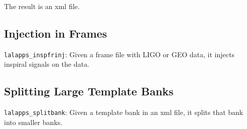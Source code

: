   The result is an xml file.

\subsection{Injection in Frames}

\texttt{lalapps\_inspfrinj}: Given a frame file with LIGO or GEO data, it
injects inspiral signals on the data.


\subsection{Splitting Large Template Banks}

\texttt{lalapps\_splitbank}: Given a template bank in an xml file, it splits
that bank into smaller banks.

\clearpage


\clearpage


\clearpage


\clearpage


\clearpage


\clearpage


\clearpage


\clearpage


\clearpage


\clearpage


%
%
